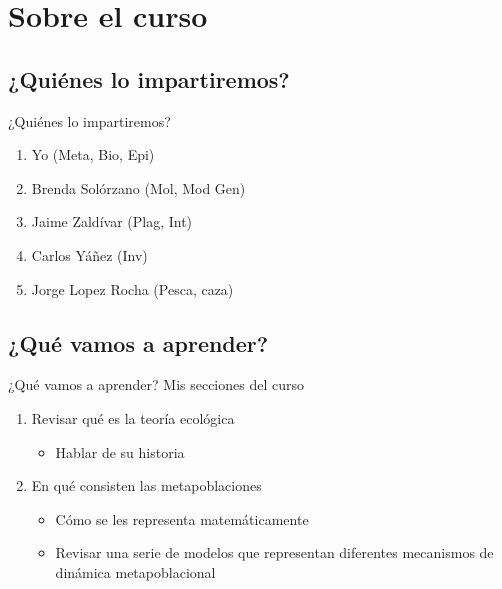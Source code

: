 \documentclass[
  11pt,
  ignorenonframetext,
]{beamer}
\providecommand{\tightlist}{%
  \setlength{\itemsep}{0pt}\setlength{\parskip}{0pt}}
\begin{document}
\hypertarget{sobre-el-curso}{%
\section{Sobre el curso}\label{sobre-el-curso}}

\hypertarget{quiuxe9nes-lo-impartiremos}{%
\subsection{¿Quiénes lo
impartiremos?}\label{quiuxe9nes-lo-impartiremos}}

\begin{frame}{¿Quiénes lo impartiremos?}
\begin{enumerate}
\item
  Yo (Meta, Bio, Epi)
\item
  Brenda Solórzano (Mol, Mod Gen)
\item
  Jaime Zaldívar (Plag, Int)
\item
  Carlos Yáñez (Inv)
\item
  Jorge Lopez Rocha (Pesca, caza)
\end{enumerate}
\end{frame}

\hypertarget{quuxe9-vamos-a-aprender}{%
\subsection{¿Qué vamos a aprender?}\label{quuxe9-vamos-a-aprender}}

\begin{frame}{¿Qué vamos a aprender?}
Mis secciones del curso

\begin{enumerate}
\item
  Revisar qué es la teoría ecológica

  \begin{itemize}
  \tightlist
  \item
    Hablar de su historia
  \end{itemize}
\item
  En qué consisten las metapoblaciones

  \begin{itemize}
  \item
    Cómo se les representa matemáticamente
  \item
    Revisar una serie de modelos que representan diferentes mecanismos
    de dinámica metapoblacional
  \end{itemize}
\end{enumerate}
\end{frame}
\end{document}
